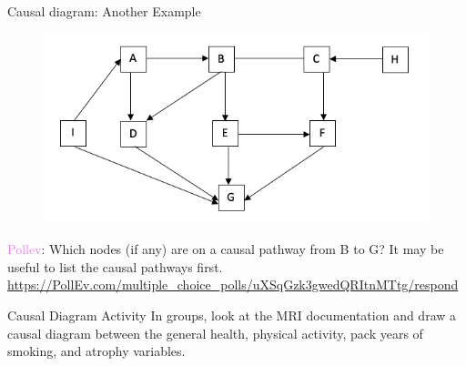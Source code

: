 \documentclass[10pt,t]{beamer}
\begin{document}
\begin{frame}{Causal diagram: Another Example}

\vspace{-5 mm}

\begin{figure}
	\centering \includegraphics[scale=0.4]{figures/dag1.png}
\end{figure}

\vspace{0.1cm} 

\textcolor{violet}{Pollev}: Which nodes (if any) are on a causal pathway from B to G? It may be useful to list the causal pathways first. 
{\scriptsize \url{https://PollEv.com/multiple_choice_polls/uXSqGzk3gwedQRItnMTtg/respond}}

\end{frame}

\begin{frame}{Causal Diagram Activity}
	In groups, look at the MRI documentation and draw a causal diagram between the general health, physical activity, pack years of smoking, and atrophy variables. 
\end{frame}
\end{document}
